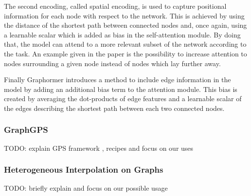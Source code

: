 The second encoding, called spatial encoding, is used to capture positional information for each node with respect to the network. This is achieved by using the distance of the shortest path between connected nodes and, once again, using a learnable scalar which is added as bias in the self-attention module. By doing that, the model can attend to a more relevant subset of the network according to the task. An example given in the paper is the possibility to increase attention to nodes surrounding a given node instead of nodes which lay further away.

Finally Graphormer introduces a method to include edge information in the model by adding an additional bias term to the attention module. This bias is created by averaging the dot-products of edge features and a learnable scalar of the edges describing the shortest path between each two connected nodes.  

\subsubsection{GraphGPS}
TODO: explain GPS framework \cite{2023graphgps}, recipes and focus on our uses

\subsubsection{Heterogeneous Interpolation on Graphs}
TODO: briefly explain and focus on our possible usage
